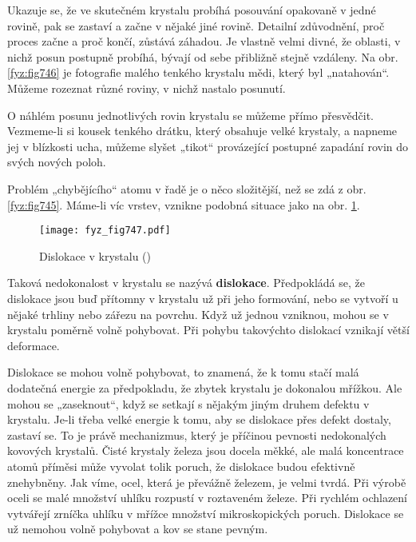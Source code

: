     Ukazuje se, že ve skutečném krystalu probíhá posouvání opakovaně v jedné rovině, pak se zastaví 
    a začne v nějaké jiné rovině. Detailní zdůvodnění, proč proces začne a proč končí, zůstává 
    záhadou. Je vlastně velmi divné, že oblasti, v nichž posun postupně probíhá, bývají od sebe 
    přibližně stejně vzdáleny. Na obr. \ref{fyz:fig746} je fotografie malého tenkého krystalu mědi, 
    který byl „natahován“. Můžeme rozeznat různé roviny, v nichž nastalo posunutí.
    
    O náhlém posunu jednotlivých rovin krystalu se můžeme přímo přesvědčit. Vezmeme-li si kousek 
    tenkého drátku, který obsahuje velké krystaly, a napneme jej v blízkosti ucha, můžeme slyšet 
    „tikot“ provázející postupné zapadání rovin do svých nových poloh. 
    
    Problém „chybějícího“ atomu v řadě je o něco složitější, než se zdá z obr. \ref{fyz:fig745}. 
    Máme-li víc vrstev, vznikne podobná situace jako na obr. \ref{fyz:fig747}. 
    
    \begin{figure}[ht!] %
      \centering
      \texttt{[image: fyz\_fig747.pdf]}
      \caption{Dislokace v krystalu
               (\cite[s.~554]{Feynman02})}
      \label{fyz:fig747}
    \end{figure}

    Taková nedokonalost v krystalu se nazývá \textbf{dislokace}. Předpokládá se, že dislokace jsou 
    buď přítomny v krystalu už při jeho formování, nebo se vytvoří u nějaké trhliny nebo zářezu na 
    povrchu. Když už jednou vzniknou, mohou se v krystalu poměrně volně pohybovat. Při pohybu 
    takovýchto dislokací vznikají větší deformace.
    
    Dislokace se mohou volně pohybovat, to znamená, že k tomu stačí malá dodatečná energie za 
    předpokladu, že zbytek krystalu je dokonalou mřížkou. Ale mohou se „zaseknout“, když se setkají 
    s nějakým jiným druhem defektu v krystalu. Je-li třeba velké energie k tomu, aby se dislokace 
    přes defekt dostaly, zastaví se. To je právě mechanizmus, který je příčinou pevnosti 
    nedokonalých kovových krystalů. Čisté krystaly železa jsou docela měkké, ale malá koncentrace 
    atomů příměsi může vyvolat tolik poruch, že dislokace budou efektivně znehybněny. Jak víme, 
    ocel, která je převážně železem, je velmi tvrdá. Při výrobě oceli se malé množství uhlíku 
    rozpustí v roztaveném železe. Při rychlém ochlazení vytvářejí zrníčka uhlíku v mřížce množství 
    mikroskopických poruch. Dislokace se už nemohou volně pohybovat a kov se stane pevným.
    
